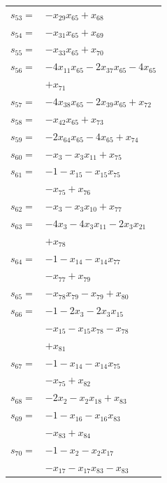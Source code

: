 \begin{longtable}{@{}r@{\;}l@{}}
\(s_{53}=\) & \(\displaystyle -x_{29}x_{65} +x_{68}\) \\[3pt]
\(s_{54}=\) & \(\displaystyle -x_{31}x_{65} +x_{69}\) \\[3pt]
\(s_{55}=\) & \(\displaystyle -x_{33}x_{65} +x_{70}\) \\[3pt]
\(s_{56}=\) & \(\displaystyle -4x_{11}x_{65} -2x_{37}x_{65} -4x_{65}\) \\
 & \(\displaystyle +x_{71}\) \\[3pt]
\(s_{57}=\) & \(\displaystyle -4x_{38}x_{65} -2x_{39}x_{65} +x_{72}\) \\[3pt]
\(s_{58}=\) & \(\displaystyle -x_{42}x_{65} +x_{73}\) \\[3pt]
\(s_{59}=\) & \(\displaystyle -2x_{64}x_{65} -4x_{65} +x_{74}\) \\[3pt]
\(s_{60}=\) & \(\displaystyle -x_{3} -x_{3}x_{11} +x_{75}\) \\[3pt]
\(s_{61}=\) & \(\displaystyle -1 -x_{15} -x_{15}x_{75}\) \\
 & \(\displaystyle -x_{75} +x_{76}\) \\[3pt]
\(s_{62}=\) & \(\displaystyle -x_{3} -x_{3}x_{10} +x_{77}\) \\[3pt]
\(s_{63}=\) & \(\displaystyle -4x_{3} -4x_{3}x_{11} -2x_{3}x_{21}\) \\
 & \(\displaystyle +x_{78}\) \\[3pt]
\(s_{64}=\) & \(\displaystyle -1 -x_{14} -x_{14}x_{77}\) \\
 & \(\displaystyle -x_{77} +x_{79}\) \\[3pt]
\(s_{65}=\) & \(\displaystyle -x_{78}x_{79} -x_{79} +x_{80}\) \\[3pt]
\(s_{66}=\) & \(\displaystyle -1 -2x_{3} -2x_{3}x_{15}\) \\
 & \(\displaystyle -x_{15} -x_{15}x_{78} -x_{78}\) \\
 & \(\displaystyle +x_{81}\) \\[3pt]
\(s_{67}=\) & \(\displaystyle -1 -x_{14} -x_{14}x_{75}\) \\
 & \(\displaystyle -x_{75} +x_{82}\) \\[3pt]
\(s_{68}=\) & \(\displaystyle -2x_{2} -x_{2}x_{18} +x_{83}\) \\[3pt]
\(s_{69}=\) & \(\displaystyle -1 -x_{16} -x_{16}x_{83}\) \\
 & \(\displaystyle -x_{83} +x_{84}\) \\[3pt]
\(s_{70}=\) & \(\displaystyle -1 -x_{2} -x_{2}x_{17}\) \\
 & \(\displaystyle -x_{17} -x_{17}x_{83} -x_{83}\) \\

\end{longtable}
